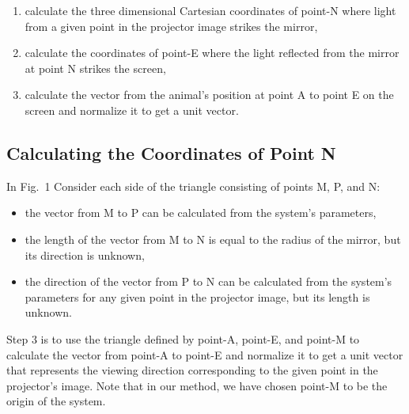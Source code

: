 \documentclass[10pt,letterpaper]{article}
\begin{document}
\begin{enumerate}

\item
calculate the three dimensional Cartesian coordinates of point-N where light
from a given point in the projector image strikes the mirror,

\item
calculate the coordinates of point-E where the light reflected from the mirror
at point N strikes the screen,

\item
calculate the vector from the animal's position at point A to point E on the
screen and normalize it to get a unit vector.

\end{enumerate}

\newpage
\subsection*{Calculating the Coordinates of Point N}
In Fig.~1 Consider each side of the triangle consisting of points M, P, and N:

\begin{itemize}

\item
the vector from M to P can be calculated from the system's parameters,

\item
the length of the vector from M to N is equal to the radius of the mirror,
but its direction is unknown,

\item
the direction of the vector from P to N can be calculated from the system's
parameters for any given point in the projector image, but its length is
unknown.

\end{itemize}





Step 3 is to
use the triangle defined by point-A, point-E, and point-M to calculate the
vector from point-A to point-E and normalize it to get a unit vector that
represents the viewing direction corresponding to the given point in the
projector's image.  Note that in our method, we have chosen point-M to be the
origin of the system.
\end{document}
